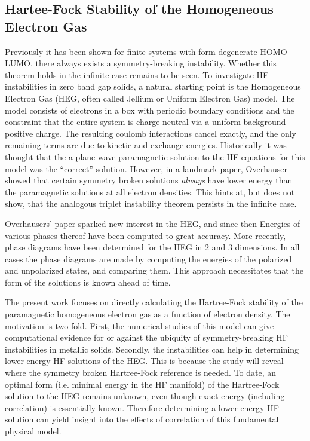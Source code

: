 \documentclass{revtex4}
\begin{document}
    \subsection{Hartee-Fock Stability of the Homogeneous Electron Gas}
    
    Previously it has been shown for finite systems with form-degenerate HOMO-LUMO, there always 
    exists a symmetry-breaking instability\cite{Yamada2015}. Whether this theorem holds in the 
    infinite case remains to be seen. To investigate HF instabilities in zero band gap solids, a 
    natural starting point is the Homogeneous Electron Gas (HEG, often called Jellium or Uniform 
    Electron Gas) model. The model consists of electrons in a box with periodic boundary conditions 
    and the constraint that the entire system is charge-neutral via a uniform background positive 
    charge. The resulting coulomb interactions cancel exactly, and the only remaining terms are due 
    to kinetic and exchange energies. Historically it was thought that the 
    a plane wave paramagnetic solution to the HF equations for this model was the ``correct'' 
    solution. However, in a landmark paper, Overhauser showed that certain symmetry broken 
    solutions \emph{always} have lower energy than the paramagnetic solutions at all electron 
    densities\cite{Overhauser1962}. This hints at, but does not show, that the analogous triplet 
    instability theorem persists in the infinite case.  
    
      Overhausers' paper sparked new interest in the HEG, and since then Energies of various 
      phases thereof 
      have been computed to great 
    accuracy\cite{Ceperley1980}. More 
    recently, phase diagrams have been determined for the 
    HEG in 2 and 3 dimensions\cite{Delyon2008, Bernu2011, Baguet2013}. In all cases the 
    phase diagrams are made by computing the energies of the polarized and unpolarized states, and 
    comparing them. This approach necessitates that the form of the solutions is known ahead of 
    time. 
    
    The present work focuses on directly calculating the Hartree-Fock stability of 
    the 
    paramagnetic homogeneous electron gas as a function of electron density. The motivation is 
    two-fold. First, the numerical studies of this model can give computational evidence for or 
    against the ubiquity of symmetry-breaking HF instabilities in metallic solids. Secondly, the 
    instabilities can help in determining lower energy HF solutions of the HEG. This is because the 
    study will reveal where the symmetry broken Hartree-Fock reference is needed. To date, an 
    optimal form (i.e. minimal energy in the HF manifold) of the Hartree-Fock solution to the HEG 
    remains unknown, even though exact energy 
    (including correlation) is essentially known. Therefore determining a lower energy HF solution 
    can yield insight into the effects of correlation of this fundamental physical model. 
    	
\end{document}
